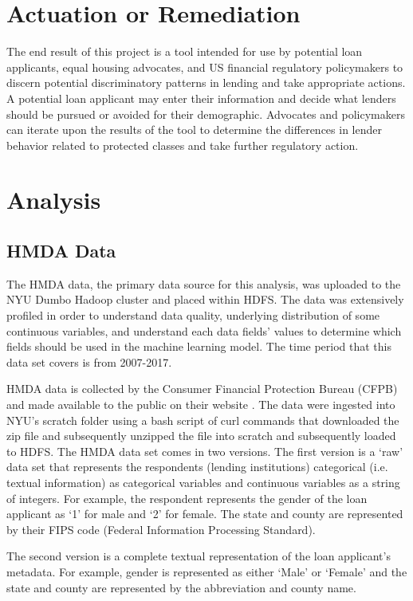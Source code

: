 \documentclass[conference,compsoc]{IEEEtran}
\begin{document}
\section{Actuation or Remediation}

 The end result of this project is a tool intended for use by potential loan applicants, equal housing advocates, and US financial regulatory policymakers to discern potential discriminatory patterns in lending and take appropriate actions. A potential loan applicant may enter their information and decide what lenders should be pursued or avoided for their demographic. Advocates and policymakers can iterate upon the results of the tool to determine the differences in lender behavior related to protected classes and take further regulatory action.

\section{Analysis}

\subsection{HMDA Data}

The HMDA data, the primary data source for this analysis, was uploaded to the NYU Dumbo Hadoop cluster and placed within HDFS.  The data was extensively profiled in order to understand data quality, underlying distribution of some continuous variables, and understand each data fields’ values to determine which fields should be used in the machine learning model.  The time period that this data set covers is from 2007-2017. 

	HMDA data is collected by the Consumer Financial Protection Bureau (CFPB) and made available to the public on their website \cite{hmdalink}.  The data were ingested into NYU’s scratch folder using a bash script of curl commands that downloaded the zip file and subsequently unzipped the file into scratch and subsequently loaded to HDFS.  The HMDA data set comes in two versions.  
The first version is a ‘raw’ data set that represents the respondents (lending institutions) categorical (i.e. textual information) as categorical variables and continuous variables as a string of integers.  For example, the respondent represents the gender of the loan applicant as ‘1’ for male and ‘2’ for female.  The state and county are represented by their FIPS code (Federal Information Processing Standard).  

The second version is a complete textual representation of the loan applicant’s metadata.  For example, gender is represented as either ‘Male’ or ‘Female’ and the state and county are represented by the abbreviation and county name. 
\end{document}
